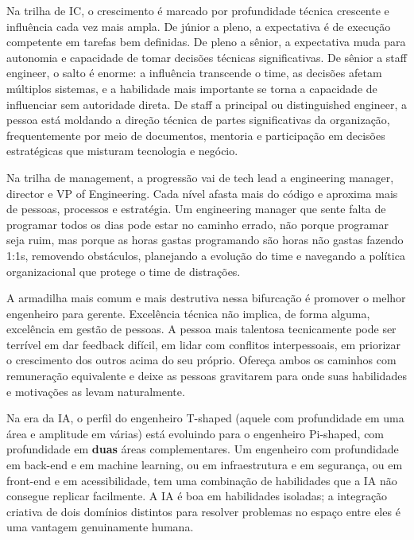 Na trilha de IC, o crescimento é marcado por profundidade técnica crescente e
influência cada vez mais ampla. De júnior a pleno, a expectativa é de
execução competente em tarefas bem definidas. De pleno a sênior, a
expectativa muda para autonomia e capacidade de tomar decisões técnicas
significativas. De sênior a staff engineer, o salto é enorme: a influência
transcende o time, as decisões afetam múltiplos sistemas, e a habilidade mais
importante se torna a capacidade de influenciar sem autoridade direta. De
staff a principal ou distinguished engineer, a pessoa está moldando a direção
técnica de partes significativas da organização, frequentemente por meio de
documentos, mentoria e participação em decisões estratégicas que misturam
tecnologia e negócio.

Na trilha de management, a progressão vai de tech lead a engineering manager,
director e VP of Engineering. Cada nível afasta mais do código e aproxima mais
de pessoas, processos e estratégia. Um engineering manager que sente falta de
programar todos os dias pode estar no caminho errado, não porque programar
seja ruim, mas porque as horas gastas programando são horas não gastas
fazendo 1:1s, removendo obstáculos, planejando a evolução do time e navegando
a política organizacional que protege o time de distrações.

A armadilha mais comum e mais destrutiva nessa bifurcação é promover o melhor
engenheiro para gerente. Excelência técnica não implica, de forma alguma,
excelência em gestão de pessoas. A pessoa mais talentosa tecnicamente pode ser
terrível em dar feedback difícil, em lidar com conflitos interpessoais, em
priorizar o crescimento dos outros acima do seu próprio. Ofereça ambos os
caminhos com remuneração equivalente e deixe as pessoas gravitarem para onde
suas habilidades e motivações as levam naturalmente.

Na era da IA, o perfil do engenheiro T-shaped (aquele com profundidade em
uma área e amplitude em várias) está evoluindo para o engenheiro Pi-shaped,
com profundidade em \textbf{duas} áreas complementares. Um engenheiro com
profundidade em back-end e em machine learning, ou em infraestrutura e em
segurança, ou em front-end e em acessibilidade, tem uma combinação de
habilidades que a IA não consegue replicar facilmente. A IA é boa em
habilidades isoladas; a integração criativa de dois domínios distintos para
resolver problemas no espaço entre eles é uma vantagem genuinamente humana.

